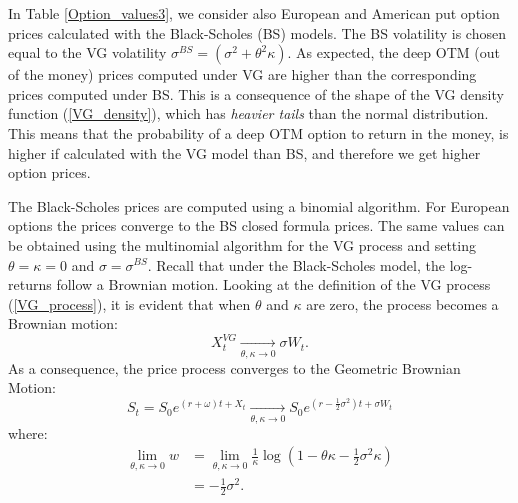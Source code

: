 In Table \ref{Option_values3}, we consider also European and American put option prices 
calculated with the Black-Scholes (BS) models.
The BS volatility is chosen equal to the VG volatility $ \sigma^{BS} = (\sigma^2 + \theta^2 \kappa)$.
As expected, the deep OTM (out of the money) prices computed under VG are higher than the corresponding prices computed under BS. This is a consequence of the
shape of the VG density function (\ref{VG_density}), which has \emph{heavier tails} than the normal distribution. This means that the probability of a deep OTM option to return in the money, 
is higher if calculated with the VG model than BS, and therefore we get higher option prices.

The Black-Scholes prices are computed using a binomial algorithm. For European options the prices converge to the BS closed formula prices. 
The same values can be obtained using the multinomial algorithm for the VG process and setting $\theta = \kappa = 0$ and $\sigma = \sigma^{BS}$.
Recall that under the Black-Scholes model, the log-returns follow a Brownian motion. 
Looking at the definition of the VG process (\ref{VG_process}), it is evident that when $\theta$ and $\kappa$ are zero, the process becomes a Brownian motion:
$$ X^{VG}_t \underset{\theta,\kappa \to 0}{\to} \sigma W_t. $$
As a consequence, the price process converges to the Geometric Brownian Motion:
$$ S_t = S_0 e^{(r+\omega)t + X_t} \underset{\theta,\kappa \to 0}{\to} S_0 e^{(r-\frac{1}{2}\sigma^2)t + \sigma W_t} $$
where:
\begin{align*}
 \lim_{\theta,\kappa \to 0} w &= \lim_{\theta,\kappa \to 0} \frac{1}{\kappa} \log(1-\theta \kappa -\frac{1}{2}\sigma^2 \kappa) \\
 &= -\frac{1}{2}\sigma^2.
\end{align*}



